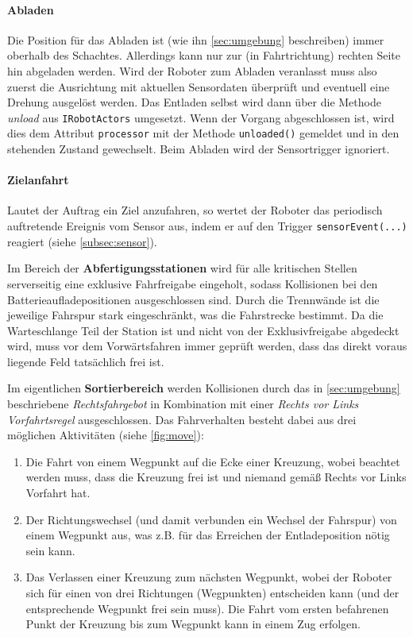 \paragraph{Abladen}
Die Position für das Abladen ist (wie ihn \autoref{sec:umgebung} beschreiben) immer oberhalb des Schachtes. Allerdings kann nur zur (in Fahrtrichtung) rechten Seite hin abgeladen werden. 
Wird der Roboter zum Abladen veranlasst muss also zuerst die Ausrichtung mit aktuellen Sensordaten überprüft und eventuell eine Drehung ausgelöst werden. 
Das Entladen selbst wird dann über die Methode \emph{unload} aus \texttt{IRobotActors} umgesetzt.
Wenn der Vorgang abgeschlossen ist, wird dies dem Attribut \texttt{processor} mit der Methode \texttt{unloaded()} gemeldet und in den stehenden Zustand gewechselt.
Beim Abladen wird der Sensortrigger ignoriert.


\paragraph{Zielanfahrt}
Lautet der Auftrag ein Ziel anzufahren, so wertet der Roboter das periodisch auftretende Ereignis vom Sensor aus, indem er auf den Trigger \texttt{sensorEvent(...)} reagiert (siehe \autoref{subsec:sensor}). 

Im Bereich der \textbf{Abfertigungsstationen} wird für alle kritischen Stellen serverseitig eine exklusive Fahrfreigabe eingeholt, sodass Kollisionen bei den Batterieaufladepositionen ausgeschlossen sind. Durch die Trennwände ist die jeweilige Fahrspur stark eingeschränkt, was die Fahrstrecke bestimmt.
Da die Warteschlange Teil der Station ist und nicht von der Exklusivfreigabe abgedeckt wird, muss vor dem Vorwärtsfahren immer geprüft werden, dass das direkt voraus liegende Feld tatsächlich frei ist.

Im eigentlichen \textbf{Sortierbereich} werden Kollisionen durch das in \autoref{sec:umgebung} beschriebene \emph{Rechtsfahrgebot} in Kombination mit einer \emph{Rechts vor Links Vorfahrtsregel} ausgeschlossen. 
Das Fahrverhalten besteht dabei aus drei möglichen Aktivitäten (siehe \autoref{fig:move}):
\begin{enumerate}
	\setlength\topsep{-1em}
	\setlength\itemsep{-0.5em}
	\item \label{step1} Die Fahrt von einem Wegpunkt auf die Ecke einer Kreuzung, wobei beachtet werden muss, dass die Kreuzung frei ist und niemand gemäß Rechts vor Links Vorfahrt hat.
	\item \label{step2} Der Richtungswechsel (und damit verbunden ein Wechsel der Fahrspur) von einem Wegpunkt aus, was z.B. für das Erreichen der Entladeposition nötig sein kann.
	\item \label{step3} Das Verlassen einer Kreuzung zum nächsten Wegpunkt, wobei der Roboter sich für einen von drei Richtungen (Wegpunkten) entscheiden kann (und der entsprechende Wegpunkt frei sein muss). Die Fahrt vom ersten befahrenen Punkt der Kreuzung bis zum Wegpunkt kann in einem Zug erfolgen.
\end{enumerate}


